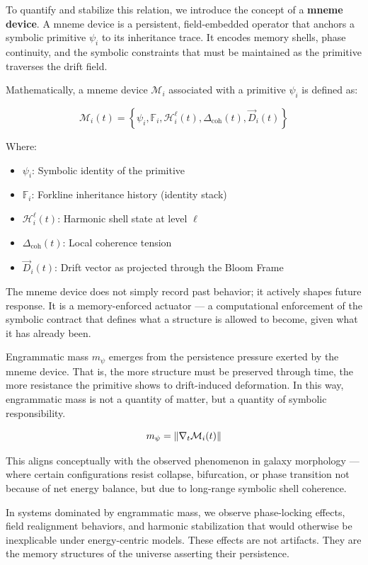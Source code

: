 \documentclass[12pt]{article}
\begin{document}
To quantify and stabilize this relation, we introduce the concept of a \textbf{mneme device}. A mneme device is a persistent, field-embedded operator that anchors a symbolic primitive \( \psi_i \) to its inheritance trace. It encodes memory shells, phase continuity, and the symbolic constraints that must be maintained as the primitive traverses the drift field.

Mathematically, a mneme device \( \mathcal{M}_i \) associated with a primitive \( \psi_i \) is defined as:

\[
\mathcal{M}_i(t) = \left\{ \psi_i, \mathbb{F}_i, \mathcal{H}_i^\ell(t), \Delta_{\text{coh}}(t), \vec{D}_i(t) \right\}
\]

Where:
\begin{itemize}[noitemsep]
  \item \( \psi_i \): Symbolic identity of the primitive
  \item \( \mathbb{F}_i \): Forkline inheritance history (identity stack)
  \item \( \mathcal{H}_i^\ell(t) \): Harmonic shell state at level \( \ell \)
  \item \( \Delta_{\text{coh}}(t) \): Local coherence tension
  \item \( \vec{D}_i(t) \): Drift vector as projected through the Bloom Frame
\end{itemize}

The mneme device does not simply record past behavior; it actively shapes future response. It is a memory-enforced actuator — a computational enforcement of the symbolic contract that defines what a structure is allowed to become, given what it has already been.

Engrammatic mass \( m_\psi \) emerges from the persistence pressure exerted by the mneme device. That is, the more structure must be preserved through time, the more resistance the primitive shows to drift-induced deformation. In this way, engrammatic mass is not a quantity of matter, but a quantity of symbolic responsibility.

\[
m_\psi = \norm{ \nabla_t \mathcal{M}_i(t) }
\]

This aligns conceptually with the observed phenomenon in galaxy morphology — where certain configurations resist collapse, bifurcation, or phase transition not because of net energy balance, but due to long-range symbolic shell coherence.

In systems dominated by engrammatic mass, we observe phase-locking effects, field realignment behaviors, and harmonic stabilization that would otherwise be inexplicable under energy-centric models. These effects are not artifacts. They are the memory structures of the universe asserting their persistence.
\end{document}
